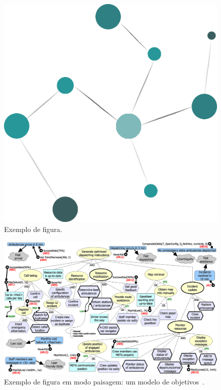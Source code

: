 \begin{figure}
	\centering
	\includegraphics[width=.25\textwidth]{figuras/fig-fundteo-exemplo.png} 
	\caption{Exemplo de figura.}
	\label{fig-fundteo-exemplo}
\end{figure}

\begin{figure}
	\centering
	\includegraphics[width=\textwidth]{figuras/fig-fundteo-exemplosideways} 
	\caption{Exemplo de figura em modo paisagem: um modelo de objetivos~\cite{souza-mylopoulos:spe13}.}
	\label{fig-fundteo-exemplosideways}
\end{figure}
